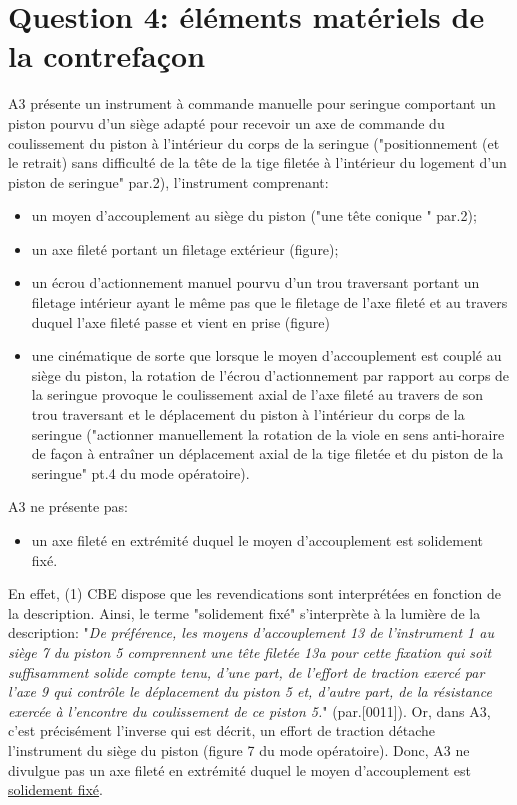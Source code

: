 \section{Question 4: éléments matériels de la contrefaçon}

A3 présente un instrument à commande manuelle pour seringue comportant
un piston pourvu d'un siège adapté pour recevoir un axe de commande du
coulissement du piston à l'intérieur du corps de la seringue
("positionnement (et le retrait) sans difficulté de la tête de la tige
filetée à l'intérieur du logement d'un piston de seringue" par.2),
l'instrument comprenant:
\begin{itemize}
    \item un moyen d'accouplement au siège du piston ("une tête conique
    " par.2);
    \item un axe fileté portant un filetage extérieur (figure);
    \item un écrou d'actionnement manuel pourvu d'un trou traversant
    portant un filetage intérieur ayant le même pas que le filetage
    de l'axe fileté et au travers duquel l'axe fileté passe et vient
    en prise (figure)
    \item une cinématique de sorte que lorsque le moyen d'accouplement
    est couplé au siège du piston, la rotation de l'écrou d'actionnement
    par rapport au corps de la seringue provoque le coulissement axial
    de l'axe fileté au travers de son trou traversant et le déplacement
    du piston à l'intérieur du corps de la seringue ("actionner manuellement
    la rotation de la viole en sens anti-horaire de façon à entraîner
    un déplacement axial de la tige filetée et du piston de la seringue" pt.4
    du mode opératoire).\\
\end{itemize}

A3 ne présente pas:
\begin{itemize}
    \item un axe fileté en extrémité duquel le moyen d'accouplement
    est solidement fixé.\\
\end{itemize}

En effet, (1) CBE dispose que les revendications sont interprétées en fonction de la description. Ainsi,
le terme "solidement fixé" s'interprète à la lumière de la description:
"\textit{De préférence, les moyens d'accouplement 13 de l'instrument 1 au siège 7 du piston 5 comprennent
une tête filetée 13a pour cette fixation qui soit suffisamment solide compte tenu, d'une part,
de l'effort de traction exercé par l'axe 9 qui contrôle le déplacement du piston 5 et, d'autre part,
de la résistance exercée à l'encontre du coulissement de ce piston 5.}" (par.[0011]). Or,
dans A3, c'est précisément l'inverse qui est décrit, un effort de traction détache
l'instrument du siège du piston (figure 7 du mode opératoire).
Donc, A3 ne divulgue pas un axe fileté
en extrémité duquel le moyen d'accouplement est \underline{solidement fixé}.\\

